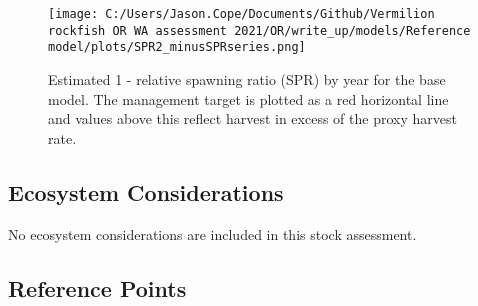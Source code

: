 \documentclass[11pt,
  english,
  a4paper,
]{article}
\begin{document}
\leavevmode\tagmcend\tagstructend\par




\begin{figure}
\centering
\texttt{[image: C:/Users/Jason.Cope/Documents/Github/Vermilion rockfish OR WA assessment 2021/OR/write\_up/models/Reference model/plots/SPR2\_minusSPRseries.png]}
\caption{Estimated 1 - relative spawning ratio (SPR) by year for the base model. The management target is plotted as a red horizontal line and values above this reflect harvest in excess of the proxy harvest rate.\label{fig:es-1-spr}}
\end{figure}

\tagmcend\tagstructend

\clearpage


\hypertarget{ecosystem-considerations}{%
\subsection*{Ecosystem Considerations}\label{ecosystem-considerations}}

\leavevmode\tagmcend\tagstructend


No ecosystem considerations are included in this stock assessment.

\leavevmode\tagmcend\tagstructend\par


\hypertarget{reference-points}{%
\subsection*{Reference Points}\label{reference-points}}

\leavevmode\tagmcend\tagstructend

\end{document}
